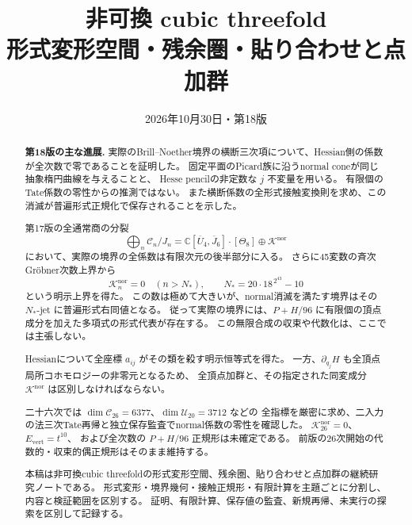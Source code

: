 \documentclass[a4paper,11pt]{ltjsarticle}
\title{\bfseries 非可換 cubic threefold\\[0.35em]
\large 形式変形空間・残余圏・貼り合わせと点加群}
\author{}
\date{2026年10月30日・第18版}
\theoremstyle{definition}
\begin{document}
\maketitle
\vspace{-1.5em}
\begin{abstract}
\noindent\textbf{第18版の主な進展.}
実際のBrill--Noether境界の横断三次項について、Hessian側の係数が全次数で零であることを証明した。
固定平面のPicard族に沿うnormal coneが同じ抽象楕円曲線を与えることと、
Hesse pencilの非定数な $j$ 不変量を用いる。
有限個のTate係数の零性からの推測ではない。
また横断係数の全形式接触変換則を求め、この消滅が普遍形式正規化で保存されることを示した。

第17版の全通常商の分裂
\[
 \bigoplus_n\mathcal C_n/J_n
 =\mathbb C[\overline U_4,\overline J_6]\cdot[\Theta_8]
       \oplus\mathcal K^{\mathrm{nor}}
\]
において、実際の境界の全係数は有限次元の後半部分に入る。
さらに45変数の斉次Gr\"obner次数上界から
\[
 \mathcal K_n^{\mathrm{nor}}=0\quad(n>N_*),
 \qquad N_*=20\cdot18^{\,2^{43}}-10
\]
という明示上界を得た。
この数は極めて大きいが、normal消滅を満たす境界はその $N_*$-jet に普遍形式右同値となる。
従って実際の境界には、$P+H/96$ に有限個の頂点成分を加えた多項式の形式代表が存在する。
この無限合成の収束や代数化は、ここでは主張しない。

Hessianについて全座標 $a_{ij}$ がその類を殺す明示恒等式を得た。
一方、$\partial_{q_j}H$ も全頂点局所コホモロジーの非零元となるため、
全頂点加群と、その指定された同変成分 $\mathcal K^{\mathrm{nor}}$ は区別しなければならない。

二十六次では $\dim\mathcal C_{26}=6377$、$\dim\mathcal U_{20}=3712$ などの
全指標を厳密に求め、二入力の法三次Tate再帰と独立保存監査でnormal係数の零性を確認した。
$\mathcal K_{26}^{\mathrm{nor}}=0$、$E_{\mathrm{vert}}=t^{10}$、
および全次数の $P+H/96$ 正規形は未確定である。
前版の26次開始の代数的・収束的偶正規形はそのまま維持する。

本稿は非可換cubic threefoldの形式変形空間、残余圏、貼り合わせと点加群の継続研究ノートである。
形式変形・境界幾何・接触正規形・有限計算を主題ごとに分割し、内容と検証範囲を区別する。
証明、有限計算、保存値の監査、新規再帰、未実行の探索を区別して記録する。

\end{abstract}






\end{document}
